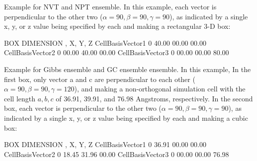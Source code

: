\documentclass[letterpaper,10pt,english]{sphinxmanual}
\begin{document}
\begin{description}
Example for NVT and NPT ensemble. In this example, each vector is perpendicular to the other two (\(\alpha = 90, \beta = 90, \gamma = 90\)), as indicated by a single x, y, or z value being specified by each and making a rectangular 3-D box:

%
\begin{sphinxVerbatim}[commandchars=\\\{\}]
\PYGZsh{}\PYGZsh{}\PYGZsh{}\PYGZsh{}\PYGZsh{}\PYGZsh{}\PYGZsh{}\PYGZsh{}\PYGZsh{}\PYGZsh{}\PYGZsh{}\PYGZsh{}\PYGZsh{}\PYGZsh{}\PYGZsh{}\PYGZsh{}\PYGZsh{}\PYGZsh{}\PYGZsh{}\PYGZsh{}\PYGZsh{}\PYGZsh{}\PYGZsh{}\PYGZsh{}\PYGZsh{}\PYGZsh{}\PYGZsh{}\PYGZsh{}\PYGZsh{}\PYGZsh{}\PYGZsh{}\PYGZsh{}\PYGZsh{}
\PYGZsh{} BOX DIMENSION \PYGZsh{}, X, Y, Z
\PYGZsh{}\PYGZsh{}\PYGZsh{}\PYGZsh{}\PYGZsh{}\PYGZsh{}\PYGZsh{}\PYGZsh{}\PYGZsh{}\PYGZsh{}\PYGZsh{}\PYGZsh{}\PYGZsh{}\PYGZsh{}\PYGZsh{}\PYGZsh{}\PYGZsh{}\PYGZsh{}\PYGZsh{}\PYGZsh{}\PYGZsh{}\PYGZsh{}\PYGZsh{}\PYGZsh{}\PYGZsh{}\PYGZsh{}\PYGZsh{}\PYGZsh{}\PYGZsh{}\PYGZsh{}\PYGZsh{}\PYGZsh{}\PYGZsh{}
CellBasisVector1 0 40.00 00.00 00.00
CellBasisVector2 0 00.00 40.00 00.00
CellBasisVector3 0 00.00 00.00 80.00
\end{sphinxVerbatim}

Example for Gibbs ensemble and GC ensemble ensemble. In this example, In the first box, only vector a and c are perpendicular to each other (\(\alpha = 90, \beta = 90, \gamma = 120\)), and making a non-orthogonal simulation cell with the cell length \(a, b, c\) of 36.91, 39.91, and 76.98 Angstroms, respectively. In the second box, each vector is perpendicular to the other two (\(\alpha = 90, \beta = 90, \gamma = 90\)), as indicated by a single x, y, or z value being specified by each and making a cubic box:

%
\begin{sphinxVerbatim}[commandchars=\\\{\}]
\PYGZsh{}\PYGZsh{}\PYGZsh{}\PYGZsh{}\PYGZsh{}\PYGZsh{}\PYGZsh{}\PYGZsh{}\PYGZsh{}\PYGZsh{}\PYGZsh{}\PYGZsh{}\PYGZsh{}\PYGZsh{}\PYGZsh{}\PYGZsh{}\PYGZsh{}\PYGZsh{}\PYGZsh{}\PYGZsh{}\PYGZsh{}\PYGZsh{}\PYGZsh{}\PYGZsh{}\PYGZsh{}\PYGZsh{}\PYGZsh{}\PYGZsh{}\PYGZsh{}\PYGZsh{}\PYGZsh{}\PYGZsh{}\PYGZsh{}
\PYGZsh{} BOX DIMENSION \PYGZsh{}, X, Y, Z
\PYGZsh{}\PYGZsh{}\PYGZsh{}\PYGZsh{}\PYGZsh{}\PYGZsh{}\PYGZsh{}\PYGZsh{}\PYGZsh{}\PYGZsh{}\PYGZsh{}\PYGZsh{}\PYGZsh{}\PYGZsh{}\PYGZsh{}\PYGZsh{}\PYGZsh{}\PYGZsh{}\PYGZsh{}\PYGZsh{}\PYGZsh{}\PYGZsh{}\PYGZsh{}\PYGZsh{}\PYGZsh{}\PYGZsh{}\PYGZsh{}\PYGZsh{}\PYGZsh{}\PYGZsh{}\PYGZsh{}\PYGZsh{}\PYGZsh{}
CellBasisVector1 0 36.91 00.00 00.00
CellBasisVector2 0 \PYGZhy{}18.45 31.96 00.00
CellBasisVector3 0 00.00 00.00 76.98


\end{sphinxVerbatim}
\end{description}
\end{document}

